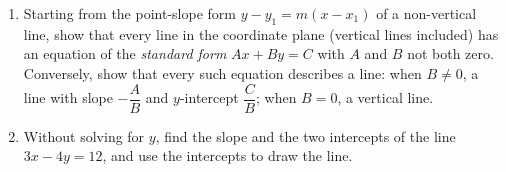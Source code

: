 \begin{enumerate}
\item[(a)] Starting from the point-slope form $y-y_1=m(x-x_1)$ of a non-vertical line, show that every line in the coordinate plane (vertical lines included) has an equation of the \emph{standard form} $Ax+By=C$ with $A$ and $B$ not both zero. Conversely, show that every such equation describes a line: when $B\ne0$, a line with slope $-\dfrac AB$ and $y$-intercept $\dfrac CB$; when $B=0$, a vertical line.
\item[(b)] Without solving for $y$, find the slope and the two intercepts of the line $3x-4y=12$, and use the intercepts to draw the line.
\end{enumerate}
